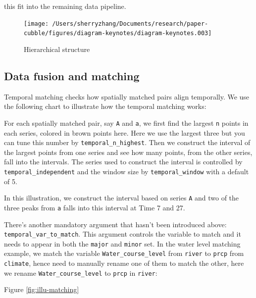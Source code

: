 \documentclass[
]{jss}
\begin{document}
this fit into the remaining data pipeline.

\begin{CodeChunk}
\begin{figure}

{\centering \texttt{[image: /Users/sherryzhang/Documents/research/paper-cubble/figures/diagram-keynotes/diagram-keynotes.003]} 

}

\caption[Hierarchical structure]{Hierarchical structure}\label{fig:illu-hier}
\end{figure}
\end{CodeChunk}

\hypertarget{data-fusion-and-matching}{%
\subsection{Data fusion and matching}\label{data-fusion-and-matching}}

Temporal matching checks how spatially matched pairs align temporally.
We use the following chart to illustrate how the temporal matching
works:

For each spatially matched pair, say \texttt{A} and \texttt{a}, we first
find the largest \texttt{n} points in each series, colored in brown
points here. Here we use the largest three but you can tune this number
by \texttt{temporal\_n\_highest}. Then we construct the interval of the
largest points from one series and see how many points, from the other
series, fall into the intervals. The series used to construct the
interval is controlled by \texttt{temporal\_independent} and the window
size by \texttt{temporal\_window} with a default of 5.

In this illustration, we construct the interval based on series
\texttt{A} and two of the three peaks from \texttt{a} falls into this
interval at Time 7 and 27.

There's another mandatory argument that hasn't been introduced above:
\texttt{temporal\_var\_to\_match}. This argument controls the variable
to match and it needs to appear in both the \texttt{major} and
\texttt{minor} set. In the water level matching example, we match the
variable \texttt{Water\_course\_level} from \texttt{river} to
\texttt{prcp} from \texttt{climate}, hence need to manually rename one
of them to match the other, here we rename \texttt{Water\_course\_level}
to \texttt{prcp} in \texttt{river}:

Figure \ref{fig:illu-matching}
\end{document}
